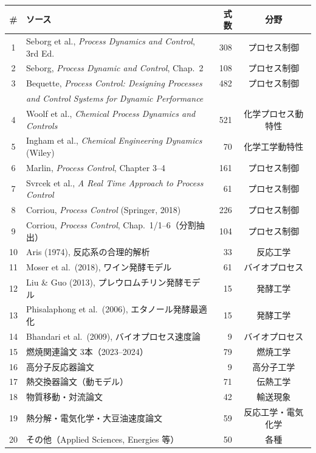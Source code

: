 \documentclass[11pt,a4paper]{ltjsarticle}
\begin{document}
\begin{longtable}{clrc}
\toprule
\# & ソース & 式数 & 分野 \\
\midrule
\endhead
1 & Seborg et al., \textit{Process Dynamics and Control}, 3rd Ed. & 308 & プロセス制御 \\
2 & Seborg, \textit{Process Dynamic and Control}, Chap.~2 & 108 & プロセス制御 \\
3 & Bequette, \textit{Process Control: Designing Processes} & 482 & プロセス制御 \\
  & \textit{and Control Systems for Dynamic Performance} & & \\
4 & Woolf et al., \textit{Chemical Process Dynamics and Controls} & 521 & 化学プロセス動特性 \\
5 & Ingham et al., \textit{Chemical Engineering Dynamics} (Wiley) & 70 & 化学工学動特性 \\
6 & Marlin, \textit{Process Control}, Chapter 3--4 & 161 & プロセス制御 \\
7 & Svrcek et al., \textit{A Real Time Approach to Process Control} & 61 & プロセス制御 \\
8 & Corriou, \textit{Process Control} (Springer, 2018) & 226 & プロセス制御 \\
9 & Corriou, \textit{Process Control}, Chap.~1/1--6（分割抽出） & 104 & プロセス制御 \\
10 & Aris (1974), 反応系の合理的解析 & 33 & 反応工学 \\
11 & Moser et al.\ (2018), ワイン発酵モデル & 61 & バイオプロセス \\
12 & Liu \& Guo (2013), プレウロムチリン発酵モデル & 15 & 発酵工学 \\
13 & Phisalaphong et al.\ (2006), エタノール発酵最適化 & 15 & 発酵工学 \\
14 & Bhandari et al.\ (2009), バイオプロセス速度論 & 9 & バイオプロセス \\
15 & 燃焼関連論文 3本（2023--2024） & 79 & 燃焼工学 \\
16 & 高分子反応器論文 & 9 & 高分子工学 \\
17 & 熱交換器論文（動モデル） & 71 & 伝熱工学 \\
18 & 物質移動・対流論文 & 42 & 輸送現象 \\
19 & 熱分解・電気化学・大豆油速度論文 & 59 & 反応工学・電気化学 \\
20 & その他（Applied Sciences, Energies 等） & 50 & 各種 \\
\bottomrule
\end{longtable}
\end{document}
